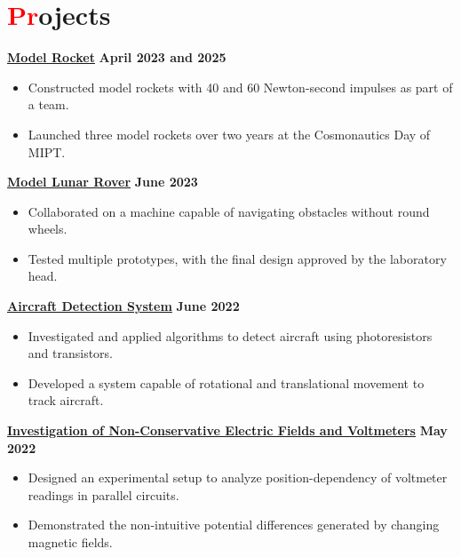 \documentclass[a4paper, 11pt]{article}
\begin{document}
\section{{\textcolor{red}{Pr}ojects}}
    {\href{https://github.com/icarus-imperium/rocket-2025}{\textbf{Model Rocket}}} \hfill \textbf{April 2023 and 2025} \\
    \begin{itemize}
        \vspace{-9pt}
    \item Constructed model rockets with 40 and 60 Newton-second impulses as part of a team.
        \vspace{-9pt}
    \item  Launched three model rockets over two years at the Cosmonautics Day of MIPT.
    \end{itemize}
    \vspace{-9pt}
    {\href{https://github.com/rezaaliasgarirenani/Rover}{\textbf{Model Lunar Rover}}} \hfill \textbf{June 2023}
    \begin{itemize}
        \vspace{-9pt}
    \item  Collaborated on a machine capable of navigating obstacles without round wheels.
        \vspace{-9pt}
    \item  Tested multiple prototypes, with the final design approved by the laboratory head.
    \end{itemize}
    \vspace{-9pt}
    {\href{https://github.com/rezaaliasgarirenani/Aircraft-Detection-System}{\textbf{Aircraft Detection System}}} \hfill \textbf{June 2022}
    \begin{itemize}
        \vspace{-9pt}
    \item  Investigated and applied algorithms to detect aircraft using photoresistors and transistors.
        \vspace{-9pt}
    \item  Developed a system capable of rotational and translational movement to track aircraft.
    \end{itemize}
    \vspace{-9pt}
    {\href{https://github.com/rezaaliasgarirenani/Non-Conservative-Electric-Fields-and-Voltmeters}{\textbf{Investigation of Non-Conservative Electric Fields and Voltmeters}}} \hfill \textbf{May 2022} \\
    \begin{itemize}
        \vspace{-9pt}
    \item  Designed an experimental setup to analyze position-dependency of voltmeter readings in parallel circuits.
        \vspace{-9pt}
    \item  Demonstrated the non-intuitive potential differences generated by changing magnetic fields.
    \end{itemize}
    \vspace{-15pt}
\end{document}
